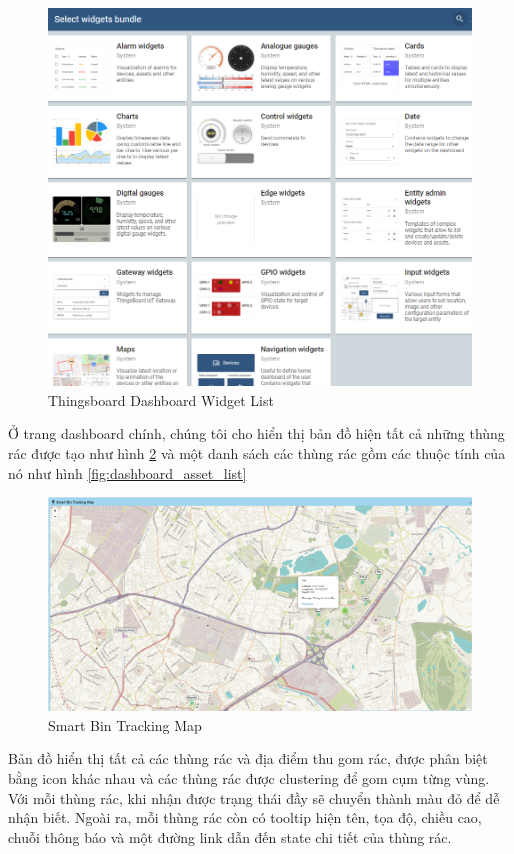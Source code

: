 \begin{figure}[H]
    \centering
    \includegraphics[width=\textwidth]{images/Khanh/Thingsboard/Dashboard_widget.PNG}
    \caption{Thingsboard Dashboard Widget List}
    \label{fig:dashboard_widget}
\end{figure}

Ở trang dashboard chính, chúng tôi cho hiển thị bản đồ hiện tất cả những thùng rác được tạo như hình \ref{fig:dashboard_map} và một danh sách các thùng rác gồm các thuộc tính của nó như hình \ref{fig:dashboard_asset_list}

\begin{figure}[H]
    \centering
    \includegraphics[width=\textwidth]{images/Khanh/Thingsboard/Dashboard_map.PNG}
    \caption{Smart Bin Tracking Map}
    \label{fig:dashboard_map}
\end{figure}
Bản đồ hiển thị tất cả các thùng rác và địa điểm thu gom rác, được phân biệt bằng icon khác nhau và các thùng rác được clustering để gom cụm từng vùng. Với mỗi thùng rác, khi nhận được trạng thái đầy sẽ chuyển thành màu đỏ để dễ nhận biết. Ngoài ra, mỗi thùng rác còn có tooltip hiện tên, tọa độ, chiều cao, chuỗi thông báo và một đường link dẫn đến state chi tiết của thùng rác. 

